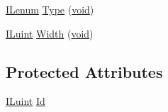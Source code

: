 \begin{DoxyCompactItemize}
\item 
\hyperlink{il_8h_a1542f3a70c0c5370a30a1fa5ce349e2d}{I\-Lenum} \hyperlink{classil_image_ab610ba6d41d923996466b2768690e521}{Type} (\hyperlink{il_8h_a5530e04d947bcddd83639ea7940faf10}{void})
\item 
\hyperlink{il_8h_ac6508d0e9c19e32f32e00d54b5b8cf30}{I\-Luint} \hyperlink{classil_image_a9c27dd232890d8448603a9dfd52b4e7d}{Width} (\hyperlink{il_8h_a5530e04d947bcddd83639ea7940faf10}{void})
\end{DoxyCompactItemize}
\subsection*{Protected Attributes}
\begin{DoxyCompactItemize}
\item 
\hyperlink{il_8h_ac6508d0e9c19e32f32e00d54b5b8cf30}{I\-Luint} \hyperlink{classil_image_aa8396db6e508ed4a5dfc812e6840123d}{Id}
\end{DoxyCompactItemize}


